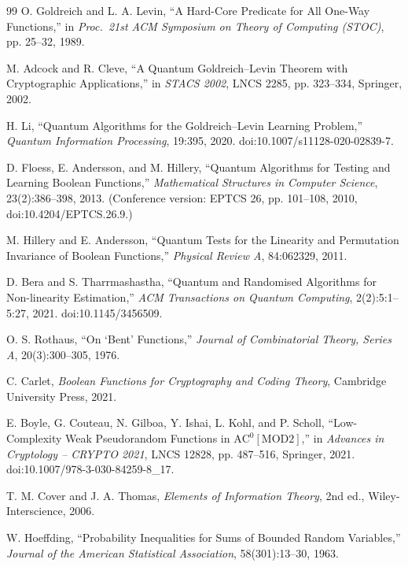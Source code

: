 \documentclass[10pt,twocolumn]{article}
\theoremstyle{definition}
\begin{document}
\begin{thebibliography}{99}
 O. Goldreich and L. A. Levin, ``A Hard-Core Predicate for All One-Way Functions,'' in \emph{Proc.\ 21st ACM Symposium on Theory of Computing (STOC)}, pp. 25--32, 1989.

 M. Adcock and R. Cleve, ``A Quantum Goldreich--Levin Theorem with Cryptographic Applications,'' in \emph{STACS 2002}, LNCS 2285, pp. 323--334, Springer, 2002.

 H. Li, ``Quantum Algorithms for the Goldreich--Levin Learning Problem,'' \emph{Quantum Information Processing}, 19:395, 2020. doi:10.1007/s11128-020-02839-7.

 D. Floess, E. Andersson, and M. Hillery, ``Quantum Algorithms for Testing and Learning Boolean Functions,'' \emph{Mathematical Structures in Computer Science}, 23(2):386--398, 2013. (Conference version: EPTCS 26, pp. 101--108, 2010, doi:10.4204/EPTCS.26.9.)

 M. Hillery and E. Andersson, ``Quantum Tests for the Linearity and Permutation Invariance of Boolean Functions,'' \emph{Physical Review A}, 84:062329, 2011.

 D. Bera and S. Tharrmashastha, ``Quantum and Randomised Algorithms for Non-linearity Estimation,'' \emph{ACM Transactions on Quantum Computing}, 2(2):5:1--5:27, 2021. doi:10.1145/3456509.

 O. S. Rothaus, ``On `Bent' Functions,'' \emph{Journal of Combinatorial Theory, Series A}, 20(3):300--305, 1976.

 C. Carlet, \emph{Boolean Functions for Cryptography and Coding Theory}, Cambridge University Press, 2021.

 E. Boyle, G. Couteau, N. Gilboa, Y. Ishai, L. Kohl, and P. Scholl, ``Low-Complexity Weak Pseudorandom Functions in $\mathrm{AC}^0[\mathrm{MOD2}]$,'' in \emph{Advances in Cryptology -- CRYPTO 2021}, LNCS 12828, pp. 487--516, Springer, 2021. doi:10.1007/978-3-030-84259-8\_17.

 T. M. Cover and J. A. Thomas, \emph{Elements of Information Theory}, 2nd ed., Wiley-Interscience, 2006.

 W. Hoeffding, ``Probability Inequalities for Sums of Bounded Random Variables,'' \emph{Journal of the American Statistical Association}, 58(301):13--30, 1963.

\end{thebibliography}
\end{document}

